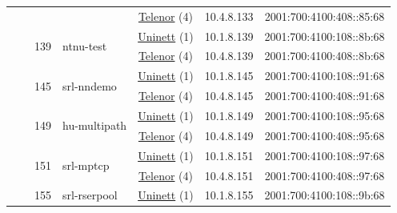 \begin{small}
\begin{center}
\begin{longtable}{|c|c|c|c|c|c|c|c|}
  &  &  &  & \multicolumn{2}{|c|}{\tiny{\href{https://www.telenor.no}{Telenor} (4)}} & \tiny{10.4.8.133} & \tiny{2001:700:4100:408::85:68} \\* \cline{3-3}\cline{4-4}\cline{5-5}\cline{6-6}\cline{7-7}\cline{8-8}
  &  & \multirow{2}{*}{\tiny{139}} & \multicolumn{1}{|l|}{\multirow{2}{*}{\tiny{ntnu-test}}} & \multicolumn{2}{|c|}{\tiny{\href{https://www.uninett.no}{Uninett} (1)}} & \tiny{10.1.8.139} & \tiny{2001:700:4100:108::8b:68} \\* \cline{5-5}\cline{6-6}\cline{7-7}\cline{8-8}
  &  &  &  & \multicolumn{2}{|c|}{\tiny{\href{https://www.telenor.no}{Telenor} (4)}} & \tiny{10.4.8.139} & \tiny{2001:700:4100:408::8b:68} \\* \cline{3-3}\cline{4-4}\cline{5-5}\cline{6-6}\cline{7-7}\cline{8-8}
  &  & \multirow{2}{*}{\tiny{145}} & \multicolumn{1}{|l|}{\multirow{2}{*}{\tiny{srl-nndemo}}} & \multicolumn{2}{|c|}{\tiny{\href{https://www.uninett.no}{Uninett} (1)}} & \tiny{10.1.8.145} & \tiny{2001:700:4100:108::91:68} \\* \cline{5-5}\cline{6-6}\cline{7-7}\cline{8-8}
  &  &  &  & \multicolumn{2}{|c|}{\tiny{\href{https://www.telenor.no}{Telenor} (4)}} & \tiny{10.4.8.145} & \tiny{2001:700:4100:408::91:68} \\* \cline{3-3}\cline{4-4}\cline{5-5}\cline{6-6}\cline{7-7}\cline{8-8}
  &  & \multirow{2}{*}{\tiny{149}} & \multicolumn{1}{|l|}{\multirow{2}{*}{\tiny{hu-multipath}}} & \multicolumn{2}{|c|}{\tiny{\href{https://www.uninett.no}{Uninett} (1)}} & \tiny{10.1.8.149} & \tiny{2001:700:4100:108::95:68} \\* \cline{5-5}\cline{6-6}\cline{7-7}\cline{8-8}
  &  &  &  & \multicolumn{2}{|c|}{\tiny{\href{https://www.telenor.no}{Telenor} (4)}} & \tiny{10.4.8.149} & \tiny{2001:700:4100:408::95:68} \\* \cline{3-3}\cline{4-4}\cline{5-5}\cline{6-6}\cline{7-7}\cline{8-8}
  &  & \multirow{2}{*}{\tiny{151}} & \multicolumn{1}{|l|}{\multirow{2}{*}{\tiny{srl-mptcp}}} & \multicolumn{2}{|c|}{\tiny{\href{https://www.uninett.no}{Uninett} (1)}} & \tiny{10.1.8.151} & \tiny{2001:700:4100:108::97:68} \\* \cline{5-5}\cline{6-6}\cline{7-7}\cline{8-8}
  &  &  &  & \multicolumn{2}{|c|}{\tiny{\href{https://www.telenor.no}{Telenor} (4)}} & \tiny{10.4.8.151} & \tiny{2001:700:4100:408::97:68} \\* \cline{3-3}\cline{4-4}\cline{5-5}\cline{6-6}\cline{7-7}\cline{8-8}
  &  & \multirow{2}{*}{\tiny{155}} & \multicolumn{1}{|l|}{\multirow{2}{*}{\tiny{srl-rserpool}}} & \multicolumn{2}{|c|}{\tiny{\href{https://www.uninett.no}{Uninett} (1)}} & \tiny{10.1.8.155} & \tiny{2001:700:4100:108::9b:68} \\* \cline{5-5}\cline{6-6}\cline{7-7}\cline{8-8}

\end{longtable}
\end{center}
\end{small}
